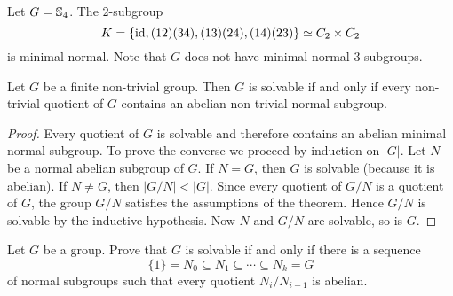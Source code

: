 \begin{example}
	Let $G=\mathbb{S}_4$. The $2$-subgroup 
	\[
	K=\{\operatorname{id},(12)(34),(13)(24),(14)(23)\}\simeq
	C_2\times C_2
	\]
	is minimal normal. Note that $G$ does not have minimal normal $3$-subgroups. 
\end{example}

\begin{theorem}
Let $G$ be a finite non-trivial group. Then $G$ is solvable if and only if 
every non-trivial quotient of $G$ contains an abelian non-trivial normal subgroup. 
\end{theorem}

\begin{proof}
Every quotient of $G$ is solvable and therefore contains an abelian 
minimal normal subgroup. To prove the converse we proceed by induction on $|G|$. Let 
$N$ be a normal abelian subgroup of $G$. If $N=G$, then $G$ is solvable (because it is abelian). If 
$N\ne G$, then $|G/N|<|G|$. Since every quotient of $G/N$ is a quotient of $G$, the group 
$G/N$ satisfies the assumptions of the theorem. Hence $G/N$ is solvable by the inductive hypothesis. 
Now $N$ and $G/N$ are solvable, so is $G$. 
\end{proof}


\begin{exercise}
	\label{exercise:solvable}
	Let $G$ be a group. Prove that $G$ is solvable if and only if there is a sequence
	\[
		\{1\}=N_0\subseteq N_1\subseteq\cdots\subseteq N_k=G
	\]
        of normal subgroups such that every quotient 
	$N_i/N_{i-1}$ is abelian.
\end{exercise}


